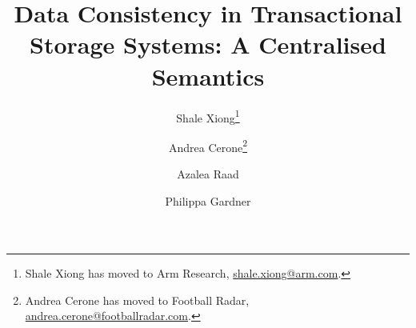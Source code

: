 \documentclass[a4paper,UKenglish,cleveref,autoref,thm-restate]{lipics-v2019}
\title{Data Consistency in Transactional Storage Systems: A Centralised Semantics}
\author{Shale Xiong\footnote{Shale Xiong has moved to Arm Research, \url{shale.xiong@arm.com}.}}
       {Department of Computing, Imperial College London, UK}{shale.xiong14@ic.ac.uk}
       {}
       {The Department of Computing, Imperial College London, and EPSRC Fellowship VeTSpec: Verified Trustworthy Software Specification (EP/R034567/1)}
\author{Andrea Cerone\footnote{Andrea Cerone has moved to Football Radar, \url{andrea.cerone@footballradar.com}.}}
       {Department of Computing, Imperial College London, UK}
       {andrea.cerone@ic.ac.uk}
       {}
       {EPSRC Programme Grant REMS: Rigorous Engineering for Mainstream Systems (EP/K008528/1), and EPSRC Fellowship VeTSpec: Verified Trustworthy Software Specification (EP/R034567/1)}
\author{Azalea Raad}
       {MPI-SWS, Germany}
       {azalea@mpi-sws.org}
       {}
       {ERC Horizon 2020 Consolidator Grant `RustBelt' (grant agreement no.\ 683289)}
\author{Philippa Gardner}
       {Department of Computing, Imperial College London, UK}
       {p.gardner@ic.ac.uk}
       {}
       {EPSRC Programme Grant REMS: Rigorous Engineering for Mainstream Systems (EP/K008528/1), and EPSRC Fellowship VeTSpec: Verified Trustworthy Software Specification (EP/R034567/1)}
\newcommand{\RootPath}{.}
\begin{document}
\maketitle

\begin{abstract}

\end{abstract}








\end{document}
